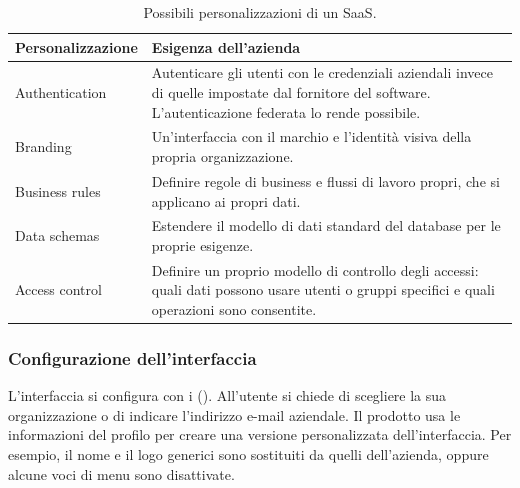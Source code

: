 \begin{table}[ht]
\centering
\small
\caption{Possibili personalizzazioni di un SaaS.}
\label{tab:cloud-personalizzazioni}
\begin{tabularx}{\linewidth}{>{\raggedright\arraybackslash}p{3cm}X}
\toprule
Personalizzazione & Esigenza dell'azienda \\
\midrule
Authentication & Autenticare gli utenti con le credenziali aziendali invece di quelle impostate dal fornitore del software.
  L'autenticazione federata lo rende possibile. \\
Branding & Un'interfaccia con il marchio e l'identità visiva della propria organizzazione. \\
Business rules & Definire regole di business e flussi di lavoro propri, che si applicano ai propri dati. \\
Data schemas & Estendere il modello di dati standard del database per le proprie esigenze. \\
Access control & Definire un proprio modello di controllo degli accessi: quali dati possono usare utenti o gruppi
  specifici e quali operazioni sono consentite. \\
\bottomrule
\end{tabularx}
\end{table}

\subsubsection{Configurazione dell'interfaccia}
L'interfaccia si configura con i  (). All'utente si chiede di
scegliere la sua organizzazione o di indicare l'indirizzo e-mail aziendale. Il prodotto usa le informazioni del
profilo per creare una versione personalizzata dell'interfaccia. Per esempio, il nome e il logo generici sono
sostituiti da quelli dell'azienda, oppure alcune voci di menu sono disattivate.

